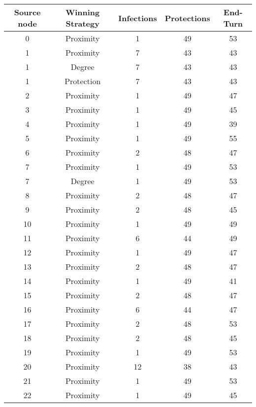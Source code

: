\documentclass[results.tex]{subfiles}
\begin{document}
\begin{center}
  \begin{tabular}{| c || c | c | c | c |}
    \hline
    {\bfseries Source node} & {\bfseries Winning Strategy} & {\bfseries Infections} & {\bfseries Protections} & {\bfseries End-Turn} \\  %
    \hline\hline
    0 & Proximity & 1 & 49 & 53 \\ 
    \hline
    1 & Proximity & 7 & 43 & 43 \\ 
    \hline
    1 & Degree & 7 & 43 & 43 \\ 
    \hline
    1 & Protection & 7 & 43 & 43 \\ 
    \hline
    2 & Proximity & 1 & 49 & 47 \\ 
    \hline
    3 & Proximity & 1 & 49 & 45 \\ 
    \hline
    4 & Proximity & 1 & 49 & 39 \\ 
    \hline
    5 & Proximity & 1 & 49 & 55 \\ 
    \hline
    6 & Proximity & 2 & 48 & 47 \\ 
    \hline
    7 & Proximity & 1 & 49 & 53 \\ 
    \hline
    7 & Degree & 1 & 49 & 53 \\ 
    \hline
    8 & Proximity & 2 & 48 & 47 \\ 
    \hline
    9 & Proximity & 2 & 48 & 45 \\ 
    \hline
    10 & Proximity & 1 & 49 & 49 \\ 
    \hline
    11 & Proximity & 6 & 44 & 49 \\ 
    \hline
    12 & Proximity & 1 & 49 & 47 \\ 
    \hline
    13 & Proximity & 2 & 48 & 47 \\ 
    \hline
    14 & Proximity & 1 & 49 & 41 \\ 
    \hline
    15 & Proximity & 2 & 48 & 47 \\ 
    \hline
    16 & Proximity & 6 & 44 & 47 \\ 
    \hline
    17 & Proximity & 2 & 48 & 53 \\ 
    \hline
    18 & Proximity & 2 & 48 & 45 \\ 
    \hline
    19 & Proximity & 1 & 49 & 53 \\ 
    \hline
    20 & Proximity & 12 & 38 & 43 \\ 
    \hline
    21 & Proximity & 1 & 49 & 53 \\ 
    \hline
    22 & Proximity & 1 & 49 & 45 \\ 

\end{tabular}
\end{center}
\end{document}

